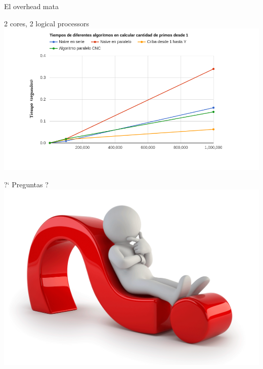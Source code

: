 \documentclass[compress]{beamer}
\begin{document}
\begin{frame}{El overhead mata}
  \begin{center}
  {2 cores, 2 logical processors}
  \\
  \includegraphics[width=1.15\textwidth]{imagenes/principioLucas.png}%
  \end{center}
\end{frame}

\begin{frame}
  \begin{center}

  {\Huge ?` Preguntas ?}
  \\
  \includegraphics[scale=0.235]{imagenes/preguntas.png}

  \end{center}
\end{frame}
\end{document}
